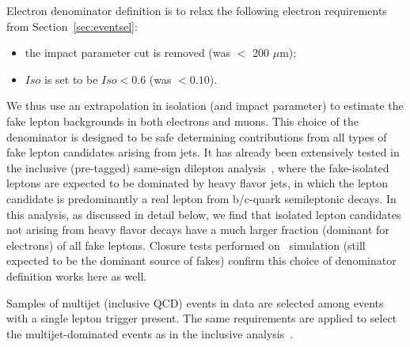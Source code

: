 Electron denominator definition is to relax the following electron requirements from
Section~\ref{sec:eventsel}:
\begin{itemize}
\item the impact parameter cut is removed (was $<$ 200 $\mu$m);
\item $Iso$ is set to be $Iso < 0.6$ (was $<0.10$).
\end{itemize}

We thus use an extrapolation  in isolation (and impact parameter) to estimate the fake lepton backgrounds 
in both electrons and muons.
This choice of the denominator is designed to be safe determining contributions
from all types of fake lepton candidates arising from jets.
It has already been extensively tested in the inclusive (pre-tagged) same-sign dilepton analysis~\cite{ssnote2011},
where the fake-isolated leptons are expected to be dominated by
heavy flavor jets, in which the lepton candidate is predominantly a real lepton from b/c-quark semileptonic decays.
In this analysis, as discussed in detail below, we find that isolated lepton candidates
not arising from heavy flavor decays have a much larger fraction (dominant for electrons) of all fake leptons.
Closure tests performed on \ttbar\ simulation (still expected to be the dominant source of fakes)
confirm this choice of denominator definition works here as well.

Samples of multijet (inclusive QCD) events in data are selected among events with a single lepton trigger present.
The same requirements are applied to select the multijet-dominated events as in the inclusive analysis~\cite{ssnote2011}.

